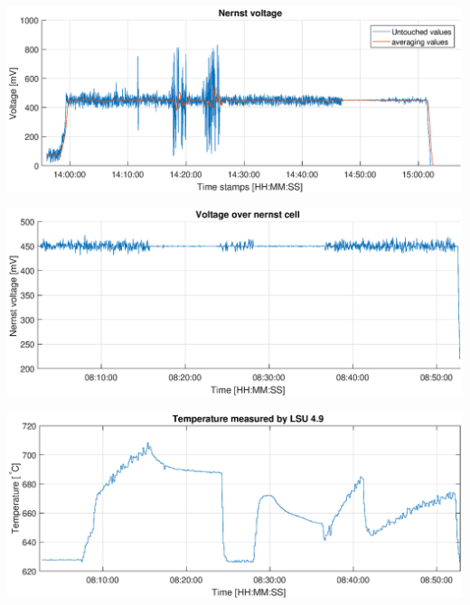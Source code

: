 \documentclass %
[																	%
	aspectratio=1610,                                               %
	11pt,															%
	hyperref={pdfpagelabels=false},									%
	xcolor	= pdftex, dvipsnames, table,							%
]																	%
{beamer}															%
\begin{document}
\begin{frame}

\begin{center}
    \includegraphics[width=\textwidth]{Images/nernst_both.eps}
\end{center}
    
\end{frame}


\begin{frame}

\begin{center}
    \includegraphics[width=\textwidth]{Images/nernst_second_small.eps}
\end{center}
    
\end{frame}


\begin{frame}

\begin{center}
    \includegraphics[width=\textwidth]{Images/temperature_second_small.eps}
\end{center}
    
\end{frame}
\end{document}
